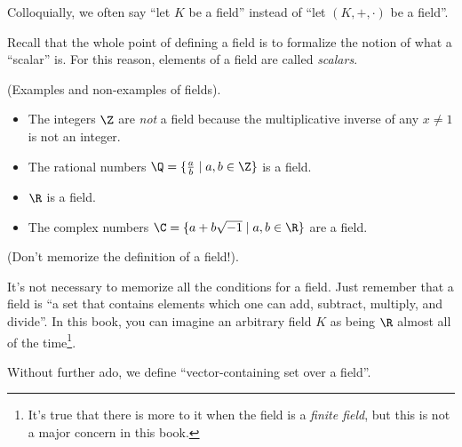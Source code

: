 \begin{defn}
    Colloquially, we often say ``let $K$ be a field'' instead of ``let $(K, +, \cdot)$ be a field''.
    
    Recall that the whole point of defining a field is to formalize the notion of what a ``scalar'' is. For this reason, elements of a field are called \textit{scalars}.
\end{defn}

\begin{remark}
    (Examples and non-examples of fields).
    
    \begin{itemize}
        \item The integers $\Z$ are \textit{not} a field because the multiplicative inverse of any $x \neq 1$ is not an integer.
        \item The rational numbers $\Q = \{\frac{a}{b} \mid a, b \in \Z\}$ is a field.
        \item $\R$ is a field.
        \item The complex numbers $\C = \{ a + b\sqrt{-1} \mid a, b \in \R\}$ are a field.
    \end{itemize}
\end{remark}

\begin{remark}
    (Don't memorize the definition of a field!).
    
    It's not necessary to memorize all the conditions for a field. Just remember that a field is ``a set that contains elements which one can add, subtract, multiply, and divide''. In this book, you can imagine an arbitrary field $K$ as being $\R$ almost all of the time\footnote{It's true that there is more to it when the field is a \textit{finite field}, but this is not a major concern in this book.}.
\end{remark}

Without further ado, we define ``vector-containing set over a field''.

